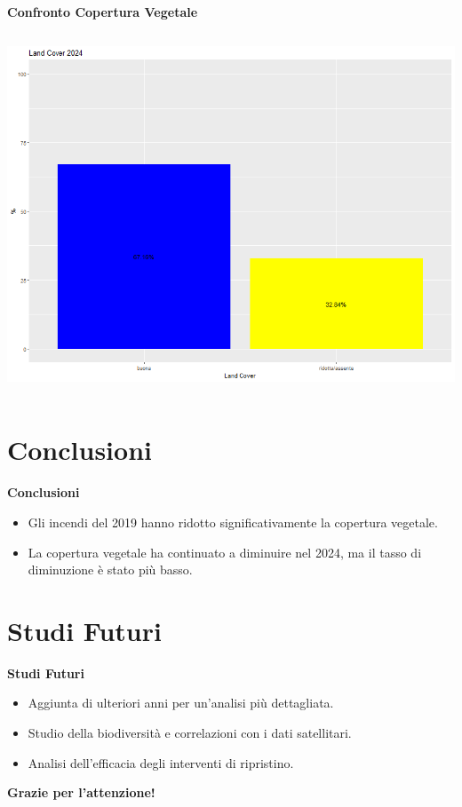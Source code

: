 \documentclass{beamer}
\begin{document}
\begin{frame}[fragile]{\textbf{Confronto Copertura Vegetale}}
\begin{columns}
    \centering
    \includegraphics[width=\textwidth]{Percentuali_Land_Cover_2024.png}
\end{columns}
\end{frame}

\section{Conclusioni}

\begin{frame}{\textbf{Conclusioni}}
\begin{itemize}
    \item Gli incendi del 2019 hanno ridotto significativamente la copertura vegetale.
    \item La copertura vegetale ha continuato a diminuire nel 2024, ma il tasso di diminuzione è stato più basso.
\end{itemize}
\end{frame}

\section{Studi Futuri}

\begin{frame}{\textbf{Studi Futuri}}
\begin{itemize}
    \item Aggiunta di ulteriori anni per un'analisi più dettagliata.
    \item Studio della biodiversità e correlazioni con i dati satellitari.
    \item Analisi dell'efficacia degli interventi di ripristino.
\end{itemize}
\end{frame}

\begin{frame}{}
\centering
\textbf{Grazie per l'attenzione!}
\end{frame}
\end{document}
